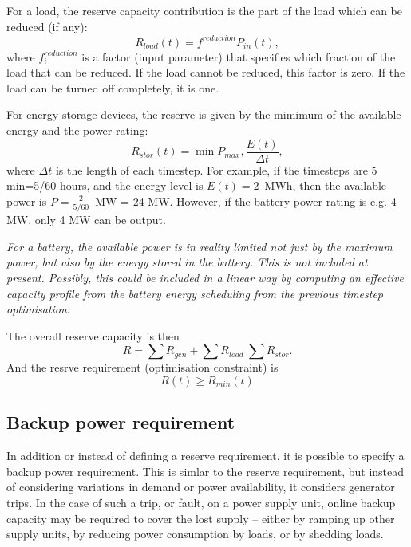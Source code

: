 \documentclass[12pt]{article}
\begin{document}
For a load, the reserve capacity contribution is the part of the load which can be reduced (if any):
\begin{equation}
	R_{load} \left( t \right) = f^{reduction}P_{in}(t), 
\end{equation}
where  \( f_{i}^{reduction} \)  is a factor (input parameter) that specifies which fraction of the load that can be reduced. 
If the load cannot be reduced, this factor is zero. If the load can be turned off completely, it is one.

For energy storage devices, the reserve is given by the mimimum of the available energy and the power rating:
\begin{equation}
	R_{stor}(t) = \min{P_{max}, \frac{E(t)}{\Delta t}},
\end{equation}
where $\Delta t$ is the length of each timestep. For example, if the timesteps are 5 min=5/60 hours, and the energy level is $E(t)=2$~MWh, then the available power is $P=\frac{2}{5/60}$~MW = 24 MW. 
However, if the battery power rating is e.g. 4 MW, only 4 MW can be output.

\textit{For a battery, the available power is in reality limited not just by the maximum power, but also by the energy stored in the battery. This is not included at present. Possibly, this could be included in a linear way by computing an effective capacity profile from the battery energy scheduling from the previous timestep optimisation}.

The overall reserve capacity is then
\begin{equation}
	R=  \sum R_{gen} + \sum R_{load}  \ \sum R_{stor} . 
\end{equation}
And the resrve requirement (optimisation constraint) is
\begin{equation}
	R(t) \ge R_{min}(t)
\end{equation}


\subsection{Backup power requirement}
In addition or instead of defining a reserve requirement, it is possible to specify a backup power requirement. This is simlar to the reserve requirement, but instead of considering variations in demand or power availability, it considers generator trips.
In the case of such a trip, or fault, on a power supply unit, online backup capacity may be required to cover the lost supply – either by ramping up other supply units, by reducing power consumption by loads, or by shedding loads.
\end{document}
